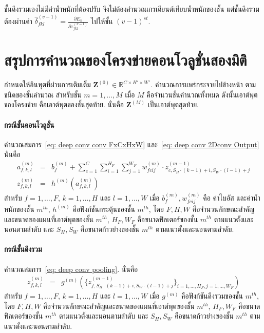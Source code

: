 ชั้นดึงรวมเองไม่มีค่าน้ำหนักที่ต้องปรับ 
จึงไม่ต้องคำนวณเกรเดียนต์เทียบน้ำหนักของชั้น
แต่ชั้นดึงรวมต้องผ่านค่า $\hat{\delta}_{fkl}^{(v-1)} = \frac{\partial E_n}{\partial z_{fkl}^{(v-1)}}$
ไปให้ชั้น $(v-1)^{st}$.

\section{สรุปการคำนวณของโครงข่ายคอนโวลูชั่นสองมิติ}
\label{sec: deep conv summary}

กำหนดให้อินพุตที่ผ่านการเติมเต็ม $\bm{Z}^{(0)} \in \mathbb{R}^{C \times H' \times W'}$.
คำนวณการแพร่กระจายไปข้างหน้า ตามชนิดของชั้นคำนวณ
สำหรับชั้น $m = 1, \ldots, M$
เมื่อ $M$ คือจำนวนชั้นคำนวณทั้งหมด 
ดังนั้นเอาต์พุตของโครงข่าย คือเอาต์พุตของชั้นสุดท้าย.
นั่นคือ $\bm{Z}^{(M)}$ เป็นเอาต์พุตสุดท้าย.

\paragraph{กรณีชั้นคอนโวลูชั่น}
คำนวณสมการ~\ref{eq: deep conv conv FxCxHxW} และ~\ref{eq: deep conv 2Dconv Output} นั่นคือ
\begin{eqnarray}
a_{f,k,l}^{(m)} &=& b_f^{(m)} + \sum_{c=1}^C \sum_{i=1}^{H_F} \sum_{j=1}^{W_F} w_{fcij}^{(m)} \cdot z_{c, S_H \cdot (k-1)+i, S_W \cdot (l-1)+j}^{(m-1)}
\nonumber \\
z_{f,k,l}^{(m)} &=& h^{(m)}(a_{f,k,l}^{(m)})
\nonumber
\end{eqnarray}
สำหรับ
$f = 1, \ldots, F$,
$k = 1, \ldots, H$ และ
$l = 1, \ldots, W$
เมื่อ
$b_f^{(m)}, w_{fcij}^{(m)}$ คือ ค่าไบอัส และค่าน้ำหนักของชั้น $m^{th}$,
$h^{(m)}$ คือฟังก์ชันกระตุ้นของชั้น $m^{th}$,
โดย
$F, H, W$ คือจำนวนลักษณะสำคัญและขนาดของแผนที่เอาต์พุตของชั้น $m^{th}$,
$H_F, W_F$ คือขนาดฟิลเตอร์ของชั้น $m^{th}$ ตามแนวตั้งและนอนตามลำดับ และ 
$S_H, S_W$ คือขนาดก้าวย่างของชั้น $m^{th}$ ตามแนวตั้งและนอนตามลำดับ.

\paragraph{กรณีชั้นดึงรวม}
คำนวณสมการ~\ref{eq: deep conv pooling}.
นั่นคือ
\begin{eqnarray}
z_{f,k,l}^{(m)} &=& g^{(m)}( \{ z_{f, S_H \cdot (k-1)+i, S_W \cdot (l-1)+j}^{(m-1)} \}_{i=1,\ldots, H_F, j=1,\ldots, W_F} ) 
\nonumber
\end{eqnarray}
สำหรับ
$f = 1, \ldots, F$,
$k = 1, \ldots, H$ และ
$l = 1, \ldots, W$
เมื่อ
$g^{(m)}$ คือฟังก์ชันดึงรวมของชั้น $m^{th}$,
โดย
$F, H, W$ คือจำนวนลักษณะสำคัญและขนาดของแผนที่เอาต์พุตของชั้น $m^{th}$,
$H_F, W_F$ คือขนาดฟิลเตอร์ของชั้น $m^{th}$ ตามแนวตั้งและนอนตามลำดับ และ 
$S_H, S_W$ คือขนาดก้าวย่างของชั้น $m^{th}$ ตามแนวตั้งและนอนตามลำดับ.

